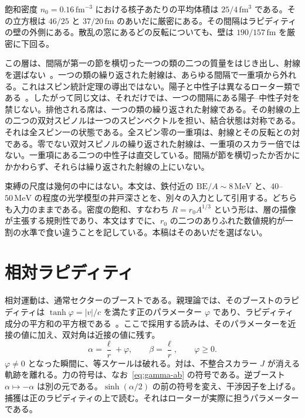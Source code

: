 \documentclass[a4paper]{article}
\begin{document}
飽和密度 \(n_0=0.16\,\mathrm{fm}^{-3}\) における核子あたりの平均体積は \(25/4\,\mathrm{fm}^{3}\) である。その立方根は \(46/25\) と \(37/20\,\mathrm{fm}\) のあいだに厳密にある。その間隔はラピディティの壁の外側にある。散乱の窓にあるどの反転についても、壁は \(190/157\,\mathrm{fm}\) を厳密に下回る。

この層は、間隔が第一の節を横切った一つの類の二つの質量をはじき出し、射線を選ばない~\cite{dst-main}。一つの類の繰り返された射線は、あらゆる間隔で一重項から外れる。これはスピン統計定理の導出ではない。陽子と中性子は異なるローター類である~\cite{dst-dio}。したがって同じ文は、それだけでは、一つの間隔にある陽子--中性子対を禁じない。排他される席は、一つの類の繰り返された射線である。その射線の上の二つの双対スピノルは一つのスピンベクトルを担い、結合状態は対称である。それは全スピン一の状態である。全スピン零の一重項は、射線とその反転との対である。零でない双対スピノルの繰り返された射線は、一重項のスカラー倍ではない。一重項にある二つの中性子は直交している。間隔が節を横切ったか否かにかかわらず、それらは繰り返された射線の上にいない。

束縛の尺度は幾何の中にはない。本文は、鉄付近の \(\mathrm{BE}/A\sim 8\,\mathrm{MeV}\) と、\(40\)--\(50\,\mathrm{MeV}\) の程度の光学模型の井戸深さとを、別々の入力として引用する。どちらも入力のままである。密度の飽和、すなわち \(R=r_0 A^{1/3}\) という形は、層の描像が主張する規則性であり、本文はすでに、\(r_0\) の二つのありふれた数値規約が一割の水準で食い違うことを記している。本稿はそのあいだを選ばない。

\section{相対ラピディティ}
\label{sec:rapidity}

相対運動は、通常セクターのブーストである。親理論では、そのブーストのラピディティは \(\tanh\varphi=|v|/c\) を満たす正のパラメーター \(\varphi\) であり、ラピディティ成分の平方和の平方根である~\cite{dst-main}。ここで採用する読みは、そのパラメーターを近接の値に加え、双対角は近接の値に残す。
\begin{equation}
\label{eq:ansatz}
\alpha=\frac{\ell}{r}+\varphi,
\qquad
\beta=\frac{\ell}{r},
\qquad
\varphi\ge 0.
\end{equation}
\(\varphi\neq 0\) となった瞬間に、等スケールは破れる。対は、不整合スカラー \(J\) が消える軌跡を離れる。力の符号は、なお~\eqref{eq:gamma-ab} の符号である。逆ブースト \(\alpha\mapsto-\alpha\) は別の元である。\(\sinh(\alpha/2)\) の前の符号を変え、干渉因子を上げる。捕獲は正のラピディティの上で読む。それはローターが実際に担うパラメーターである。
\end{document}
